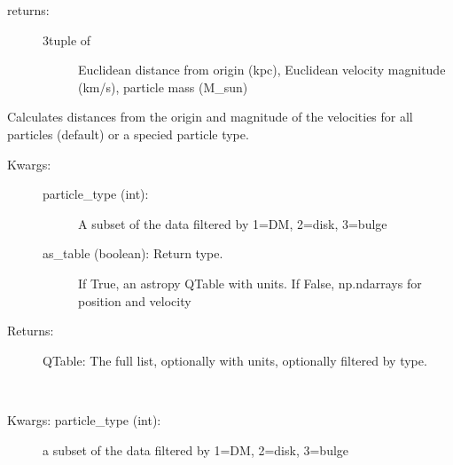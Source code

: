 \documentclass[letterpaper,10pt,english]{sphinxmanual}
\begin{document}
\begin{fulllineitems}
\begin{fulllineitems}
\begin{description}
\item[{returns:}] \leavevmode\begin{description}
\item[{3\sphinxhyphen{}tuple of}] \leavevmode
Euclidean distance from origin (kpc),
Euclidean velocity magnitude (km/s),
particle mass (M\_sun)

\end{description}

\end{description}

\end{fulllineitems}


\begin{fulllineitems}
\label{\detokenize{galaxy:galaxy.galaxy.Galaxy.all_particle_properties}}
Calculates distances from the origin and magnitude of the velocities
for all particles (default) or a specied particle type.
\begin{description}
\item[{Kwargs: }] \leavevmode\begin{description}
\item[{particle\_type (int):}] \leavevmode
A subset of the data filtered by 1=DM, 2=disk, 3=bulge

\item[{as\_table (boolean): Return type. }] \leavevmode
If True, an astropy QTable with units. 
If False, np.ndarrays for position and velocity

\end{description}

\item[{Returns:}] \leavevmode
QTable: 
The full list, optionally with units, optionally filtered by type.

\end{description}

\end{fulllineitems}


\begin{fulllineitems}
\label{\detokenize{galaxy:galaxy.galaxy.Galaxy.component_count}}~\begin{description}
\item[{Kwargs: particle\_type (int):}] \leavevmode
a subset of the data filtered by 1=DM, 2=disk, 3=bulge


\end{description}
\end{fulllineitems}
\end{fulllineitems}
\end{document}
